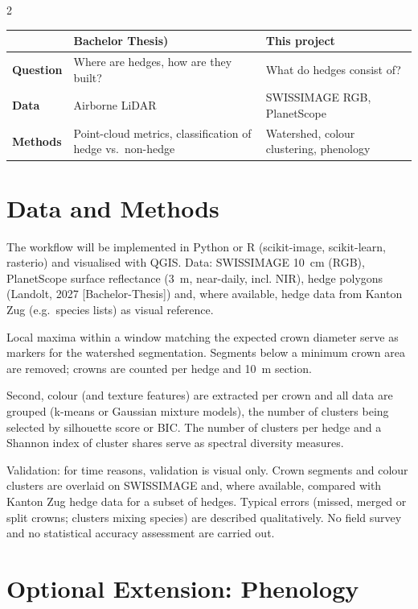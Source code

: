 \documentclass[10pt,a4paper]{article}
\begin{document}
\begin{multicols}{2}
\vspace{2pt}
{\footnotesize
\begin{tabularx}{\columnwidth}{@{}>{\bfseries}p{1.25cm}
  >{\raggedright\arraybackslash}X
  >{\raggedright\arraybackslash}X@{}}
\toprule
 & Bachelor Thesis) & This project \\
\midrule
Question & Where are hedges, how are they built?
  & What do hedges consist of? \\
Data & Airborne LiDAR & SWISSIMAGE RGB, PlanetScope \\
Methods & Point-cloud metrics, classification of
  hedge vs.\ non-hedge
  & Watershed, colour clustering, phenology \\
\bottomrule
\end{tabularx}
}


\section*{Data and Methods}

The workflow will be implemented in Python or R
(scikit-image, scikit-learn, rasterio) and visualised with
QGIS. Data: SWISSIMAGE 10~cm (RGB), PlanetScope surface
reflectance (3~m, near-daily, incl. NIR),
hedge polygons (Landolt, 2027 [Bachelor-Thesis]) and, where
available, hedge data from Kanton Zug (e.g.\ species lists)
as visual reference.

Local maxima within a window matching the expected
crown diameter serve as markers for the watershed
segmentation. Segments below a minimum crown area are
removed; crowns are counted per hedge and 10~m section.

Second, colour (and texture features)
are extracted per crown and all data are grouped (k-means or
Gaussian mixture models), the number of clusters being
selected by silhouette score or BIC. The number of
clusters per hedge and a Shannon index of cluster
shares serve as spectral diversity measures.

Validation: for time reasons, validation is visual
only. Crown segments and colour clusters are overlaid
on SWISSIMAGE and, where available, compared with
Kanton Zug hedge data for a subset of hedges. Typical
errors (missed, merged or split crowns; clusters
mixing species) are described qualitatively. No field
survey and no statistical accuracy assessment are
carried out.


\section*{Optional Extension: Phenology}


\end{multicols}
\end{document}

